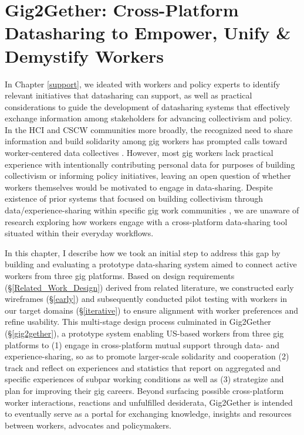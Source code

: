 \chapter{Gig2Gether: Cross-Platform Datasharing to Empower, Unify \& Demystify Workers} 
In Chapter \ref{support}, we ideated with workers and policy experts to identify relevant initiatives that datasharing can support, as well as practical considerations to guide the development of datasharing systems that effectively exchange information among stakeholders for advancing collectivism and policy.
In the HCI and CSCW communities more broadly, the recognized need to share information and build solidarity among gig workers has prompted calls toward worker-centered data collectives \cite{supporting, cscw_workshop, calacci2022organizing, stein2023you, sousveillance}. 
However, most gig workers lack practical experience with intentionally contributing personal data for purposes of building collectivism or informing policy initiatives, leaving an open question of whether workers themselves would be motivated to engage in data-sharing. Despite existence of prior systems that focused on building collectivism through data/experience-sharing within specific gig work communities \cite{dynamo, calacci2022bargaining}, we are unaware of research exploring how workers engage with a cross-platform data-sharing tool situated within their everyday workflows.

{In this chapter, I describe how we took an initial step to address this gap by building and evaluating a prototype data-sharing system aimed to connect active workers from three gig platforms.
Based on design requirements {(\S\ref{Related_Work_Design})} derived from related literature, we constructed early wireframes {(\S\ref{early})} and subsequently
conducted pilot testing with workers in our target domains (\S\ref{iterative}) to ensure alignment with worker preferences and refine usability.}
{This multi-stage design process culminated in} Gig2Gether (\S\ref{gig2gether}), a {prototype} system {enabling} US-based workers {from three gig platforms} to (1) {engage in cross-platform mutual support through data- and experience-sharing, so as to promote larger-scale solidarity and cooperation} (2) track {and reflect on experiences and statistics that report on aggregated and specific experiences of subpar working conditions}
 as well as (3) {strategize and} plan {for improving their gig careers}. {Beyond} {surfacing possible cross-platform} worker {interactions, reactions and unfulfilled }desiderata, Gig2Gether is intended to eventually serve as a portal {for exchanging knowledge, insights and resources} between workers, advocates and policymakers.

